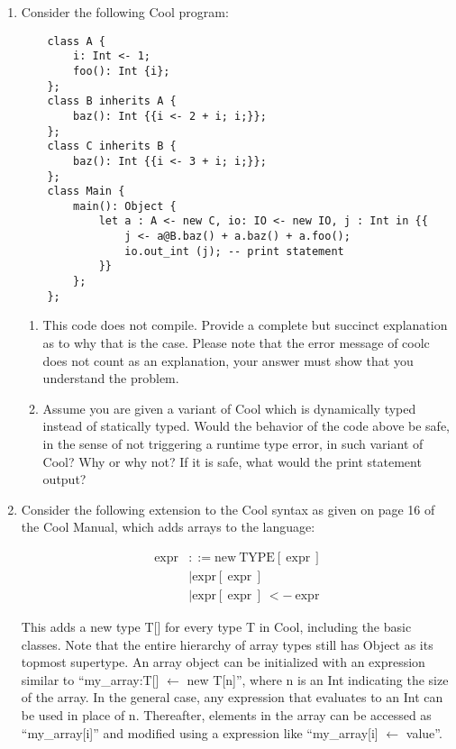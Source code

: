 \documentclass[11pt]{article}
\begin{document}
\begin{enumerate}
  \item Consider the following Cool program:
   \begin{lstlisting}
    class A {
        i: Int <- 1;
        foo(): Int {i};
    };
    class B inherits A {
        baz(): Int {{i <- 2 + i; i;}};
    };
    class C inherits B {
        baz(): Int {{i <- 3 + i; i;}};
    };
    class Main {
        main(): Object {
            let a : A <- new C, io: IO <- new IO, j : Int in {{
                j <- a@B.baz() + a.baz() + a.foo();
                io.out_int (j); -- print statement
            }}
        };
    };
    \end{lstlisting}
    \begin{enumerate}
        \item This code does not compile. Provide a complete but succinct explanation as to why that is the case. Please note that the error message of coolc does not count as an explanation, your answer must show that you understand the problem.
        \item Assume you are given a variant of Cool which is dynamically typed instead of statically typed. Would the behavior of the code above be safe, in the sense of not triggering a runtime type error, in such variant of Cool? Why or why not? If it is safe, what would the print statement output?

    \end{enumerate} \newpage
  \item  Consider the following extension to the Cool syntax as given on page 16 of the Cool Manual, which adds arrays to the language:
  
  \begin{equation}
    \begin{split}
      \mbox{expr} &::= \mbox{new} \ \mbox{TYPE}[\ \mbox{expr} \ ] \\
        &\mid \mbox{expr}[\ \mbox{expr} \ ] \\
        &\mid \mbox{expr}[\ \mbox{expr} \ ] \ <- \ \mbox{expr}
    \end{split}
  \end{equation}
  
  This adds a new type T[] for every type T in Cool, including the basic classes. Note that the entire hierarchy of array types still has Object as its topmost supertype. An array object can be initialized with an expression similar to ``my\_array:T[] $\leftarrow$ new T[n]'', where n is an Int indicating the size of the array. In the general case, any expression that evaluates to an Int can be used in place of n. Thereafter, elements in the array can be accessed as ``my\_array[i]'' and modified using a expression like ``my\_array[i] $\leftarrow$ value''.
  

\end{enumerate}
\end{document}
